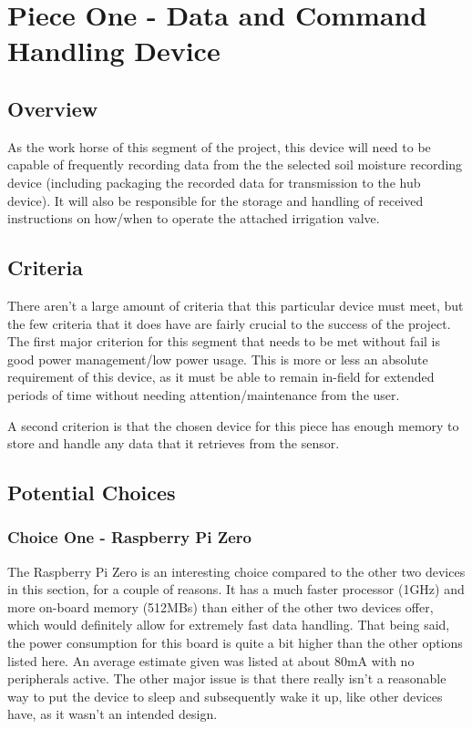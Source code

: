 \documentclass[onecolumn, draftclsnofoot,10pt, compsoc]{IEEEtran}
\begin{document}
	\section{Piece One - Data and Command Handling Device}
    \subsection{Overview}
    As the work horse of this segment of the project, this device will need to be capable of frequently recording data from the the selected soil moisture recording device (including packaging the recorded data for transmission to the hub device).
    It will also be responsible for the storage and handling of received instructions on how/when to operate the attached irrigation valve.
    \subsection{Criteria}
    There aren't a large amount of criteria that this particular device must meet, but the few criteria that it does have are fairly crucial to the success of the project.
    The first major criterion for this segment that needs to be met without fail is good power management/low power usage. This is more or less an absolute requirement of this device, as it must be able to remain in-field for extended periods of time without needing attention/maintenance from the user.\par
    A second criterion is that the chosen device for this piece has enough memory to store and handle any data that it retrieves from the sensor.
    
    \subsection{Potential Choices}
    \subsubsection{Choice One - Raspberry Pi Zero}
    The Raspberry Pi Zero is an interesting choice compared to the other two devices in this section, for a couple of reasons.
    It has a much faster processor (1GHz) and more on-board memory (512MBs) than either of the other two devices offer, which would definitely allow for extremely fast data handling.
    That being said, the power consumption for this board is quite a bit higher than the other options listed here.
    An average estimate given was listed at about 80mA with no peripherals active.\cite{rpi_power}
    The other major issue is that there really isn't a reasonable way to put the device to sleep and subsequently wake it up, like other devices have, as it wasn't an intended design.
\end{document}
